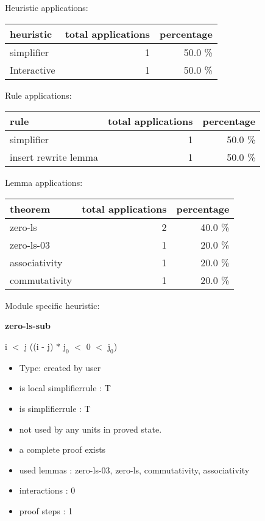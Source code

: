 \documentclass[a4paper]{article}
\begin{document}
\medskip


Heuristic applications:

\begin{supertabular}{l|r|r}
heuristic	& total applications & percentage \\ \hline
simplifier & 1 & 50.0 \% \\
Interactive & 1 & 50.0 \% \\

\end{supertabular}

Rule applications:

\begin{supertabular}{l|r|r}
rule	        & total applications & percentage \\ \hline
simplifier & 1 & 50.0 \% \\
insert rewrite lemma & 1 & 50.0 \% \\

\end{supertabular}

Lemma applications:

\begin{supertabular}{l|r|r}
theorem	        & total applications & percentage \\ \hline
zero-ls & 2 & 40.0 \% \\
zero-ls-03 & 1 & 20.0 \% \\
associativity & 1 & 20.0 \% \\
commutativity & 1 & 20.0 \% \\

\end{supertabular}

Module specific heuristic:

\pagebreak

{\LARGE\bf zero-ls-sub}\label{lemma-zero-ls-sub}

\medskip

 \Fol i $<$ j \Imp ((i - j) $*$ $\mbox{j}_{0}$ $<$ 0  $<$ $\mbox{j}_{0}$)

\begin{itemize}

\item Type: created by user

\item is local simplifierrule : T
\item is simplifierrule : T
\item not used by any units in proved state.
\item       a complete proof exists
\item       used lemmas  : zero-ls-03, zero-ls, commutativity, associativity
\item       interactions : 0
\item       proof steps  : 1
\end{itemize}
\end{document}
